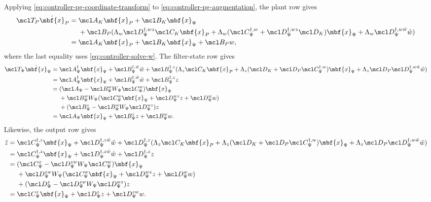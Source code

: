 Applying \eqref{eq:controller-pg-coordinate-transform} to
\eqref{eq:controller-pg-augmentation}, the plant row gives
\begin{align*}
\mcl T_P\dot{\mbf{x}}_P
={}&\mcl A_K\mbf{x}_P+\mcl B_K\mbf{x}_\Psi\\
&+\mcl B_P(
\Lambda_w\mcl D_\Psi^{\dagger,wz}\mcl C_K\mbf{x}_P
+\Lambda_w(\mcl C_\Psi^{\dagger,w}
+\mcl D_\Psi^{\dagger,wz}\mcl D_K)\mbf{x}_\Psi
+\Lambda_w\mcl D_\Psi^{\dagger,w\tilde w}\tilde w
)\\
={}&\mcl A_K\mbf{x}_P+\mcl B_K\mbf{x}_\Psi+\mcl B_Pw,
\end{align*}
where the last equality uses \eqref{eq:controller-solve-w}.
The filter-state row gives
\begin{align*}
\mcl T_\Psi\dot{\mbf{x}}_\Psi
={}&\mcl A_\Psi^\dagger\mbf{x}_\Psi
+\mcl B_\Psi^{\dagger,\tilde w}\tilde w
+\mcl B_\Psi^{\dagger,z}
(
\Lambda_z\mcl C_K\mbf{x}_P
+\Lambda_z(\mcl D_K+\mcl D_P\mcl C_\Psi^{\dagger,w})
\mbf{x}_\Psi
+\Lambda_z\mcl D_P
\mcl D_\Psi^{\dagger,w\tilde w}\tilde w
)\\
={}&\mcl A_\Psi^\dagger\mbf{x}_\Psi
+\mcl B_\Psi^{\dagger,\tilde w}\tilde w
+\mcl B_\Psi^{\dagger,z}z\\
={}&(\mcl A_\Psi-\mcl B_\Psi^wW_\Psi\mcl C_\Psi^w)
\mbf{x}_\Psi\\
&+\mcl B_\Psi^wW_\Psi
(\mcl C_\Psi^w\mbf{x}_\Psi+\mcl D_\Psi^{wz}z+\mcl D_\Psi^ww)\\
&+(\mcl B_\Psi^z-\mcl B_\Psi^wW_\Psi\mcl D_\Psi^{wz})z\\
={}&\mcl A_\Psi\mbf{x}_\Psi+\mcl B_\Psi^zz+\mcl B_\Psi^ww.
\end{align*}
Likewise, the output row gives
\begin{align*}
\tilde z
={}&\mcl C_\Psi^{\dagger,z}\mbf{x}_\Psi
+\mcl D_\Psi^{\dagger,z\tilde w}\tilde w
+\mcl D_\Psi^{\dagger,z}
(
\Lambda_z\mcl C_K\mbf{x}_P
+\Lambda_z(\mcl D_K+\mcl D_P\mcl C_\Psi^{\dagger,w})
\mbf{x}_\Psi
+\Lambda_z\mcl D_P
\mcl D_\Psi^{\dagger,w\tilde w}\tilde w
)\\
={}&\mcl C_\Psi^{\dagger,z}\mbf{x}_\Psi
+\mcl D_\Psi^{\dagger,z\tilde w}\tilde w
+\mcl D_\Psi^{\dagger,z}z\\
={}&(\mcl C_\Psi^z-\mcl D_\Psi^{zw}W_\Psi\mcl C_\Psi^w)
\mbf{x}_\Psi\\
&+\mcl D_\Psi^{zw}W_\Psi
(\mcl C_\Psi^w\mbf{x}_\Psi+\mcl D_\Psi^{wz}z+\mcl D_\Psi^ww)\\
&+(\mcl D_\Psi^z-\mcl D_\Psi^{zw}W_\Psi\mcl D_\Psi^{wz})z\\
={}&\mcl C_\Psi^z\mbf{x}_\Psi+\mcl D_\Psi^zz+\mcl D_\Psi^{zw}w.
\end{align*}
